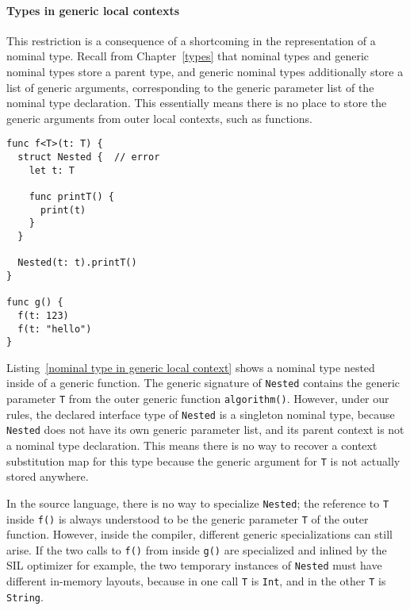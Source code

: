 \documentclass[../generics]{subfiles}
\begin{document}
\paragraph{Types in generic local contexts} This restriction is a consequence of a shortcoming in the representation of a nominal type. Recall from Chapter~\ref{types} that nominal types and generic nominal types store a parent type, and generic nominal types additionally store a list of generic arguments, corresponding to the generic parameter list of the nominal type declaration. This essentially means there is no place to store the generic arguments from outer local contexts, such as functions.

\begin{listing}\label{nominal type in generic local context}
\begin{Verbatim}
func f<T>(t: T) {
  struct Nested {  // error
    let t: T

    func printT() {
      print(t)
    }
  }
  
  Nested(t: t).printT()
}

func g() {
  f(t: 123)
  f(t: "hello")
}
\end{Verbatim}
\end{listing}

Listing~\ref{nominal type in generic local context} shows a nominal type nested inside of a generic function. The generic signature of \texttt{Nested} contains the generic parameter \texttt{T} from the outer generic function \texttt{algorithm()}. However, under our rules, the declared interface type of \texttt{Nested} is a singleton nominal type, because \texttt{Nested} does not have its own generic parameter list, and its parent context is not a nominal type declaration. This means there is no way to recover a context substitution map for this type because the generic argument for \texttt{T} is not actually stored anywhere.

In the source language, there is no way to specialize \texttt{Nested}; the reference to \texttt{T} inside \texttt{f()} is always understood to be the generic parameter \texttt{T} of the outer function. However, inside the compiler, different generic specializations can still arise. If the two calls to \texttt{f()} from inside \texttt{g()} are specialized and inlined by the SIL optimizer for example, the two temporary instances of \texttt{Nested} must have different in-memory layouts, because in one call \texttt{T} is \texttt{Int}, and in the other \texttt{T} is \texttt{String}.
\end{document}
